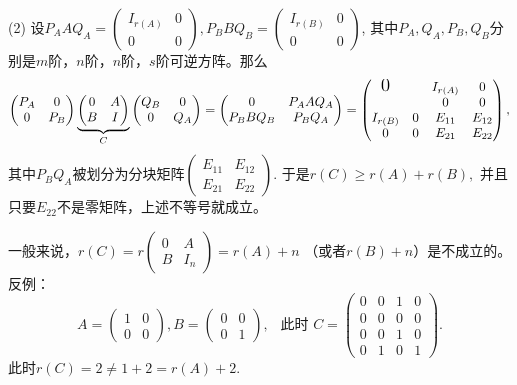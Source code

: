 (2) 设$P_A A Q_A = \begin{pmatrix} I_{r(A)} & 0 \\ 0 & 0 \end{pmatrix}, P_B B Q_B = \begin{pmatrix} I_{r(B)} & 0 \\ 0 & 0 \end{pmatrix}$, 其中$P_A, Q_A, P_B, Q_B$分别是$m$阶，$n$阶，$n$阶，$s$阶可逆方阵。那么
$$\begin{pmatrix} P_A & 0 \\ 0 & P_B \end{pmatrix} \underbrace{\begin{pmatrix} 0 & A \\ B & I \end{pmatrix}}_{C} \begin{pmatrix} Q_B & 0 \\ 0 & Q_A \end{pmatrix} = \begin{pmatrix} 0 & P_A A Q_A \\ P_B B Q_B & P_B Q_A \end{pmatrix} = \begin{pmatrix} {\Large \text{0}} & & I_{r(A)} & 0 \\ & & 0 & 0 \\ I_{r(B)} & 0 & E_{11} & E_{12} \\ 0 & 0 & E_{21} & E_{22} \end{pmatrix},$$
其中$P_B Q_A$被划分为分块矩阵$\begin{pmatrix} E_{11} & E_{12} \\ E_{21} & E_{22} \end{pmatrix}.$ 于是$r(C) \geqslant r(A) + r(B),$ 并且只要$E_{22}$不是零矩阵，上述不等号就成立。

一般来说，$r(C) = r \begin{pmatrix} 0 & A \\ B & I_n \end{pmatrix} = r(A) + n$ （或者$r(B) + n$）是不成立的。反例：
$$A = \begin{pmatrix} 1 & 0 \\ 0 & 0 \end{pmatrix}, B = \begin{pmatrix} 0 & 0 \\ 0 & 1 \end{pmatrix}, ~~ \text{ 此时 } C = \begin{pmatrix} 0 & 0 & 1 & 0 \\ 0 & 0 & 0 & 0 \\ 0 & 0 & 1 & 0 \\ 0 & 1 & 0 & 1 \end{pmatrix}.$$
此时$r(C) = 2 \neq 1 + 2 = r(A) + 2.$

